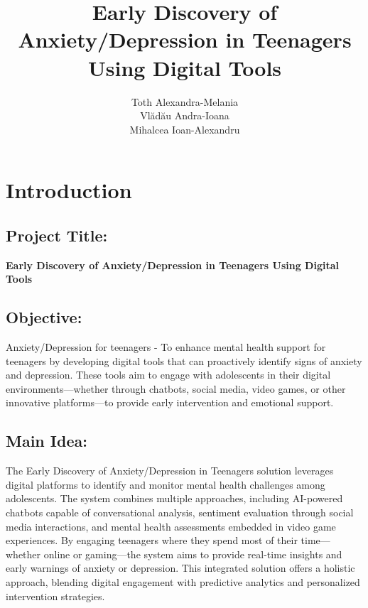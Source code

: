 \documentclass[a4paper,12pt]{article}
\title{Early Discovery of Anxiety/Depression in Teenagers Using Digital Tools}
\author{Toth Alexandra-Melania\\
Vlădău Andra-Ioana\\ 
Mihalcea Ioan-Alexandru
}
\date{}
\begin{document}
\maketitle


\vspace{0.5cm} %

\section{Introduction}

\subsection{Project Title:}
\textbf{Early Discovery of Anxiety/Depression in Teenagers Using Digital Tools}

\vspace{0.5cm} %

\subsection{Objective:}
Anxiety/Depression for teenagers - To enhance mental health support for teenagers by developing digital tools that can proactively identify signs of anxiety and depression. These tools aim to engage with adolescents in their digital environments—whether through chatbots, social media, video games, or other innovative platforms—to provide early intervention and emotional support.

\vspace{0.5cm} %

\subsection{Main Idea:}
The Early Discovery of Anxiety/Depression in Teenagers solution leverages digital platforms to identify and monitor mental health challenges among adolescents. The system combines multiple approaches, including AI-powered chatbots capable of conversational analysis, sentiment evaluation through social media interactions, and mental health assessments embedded in video game experiences. By engaging teenagers where they spend most of their time—whether online or gaming—the system aims to provide real-time insights and early warnings of anxiety or depression. This integrated solution offers a holistic approach, blending digital engagement with predictive analytics and personalized intervention strategies.
\end{document}
